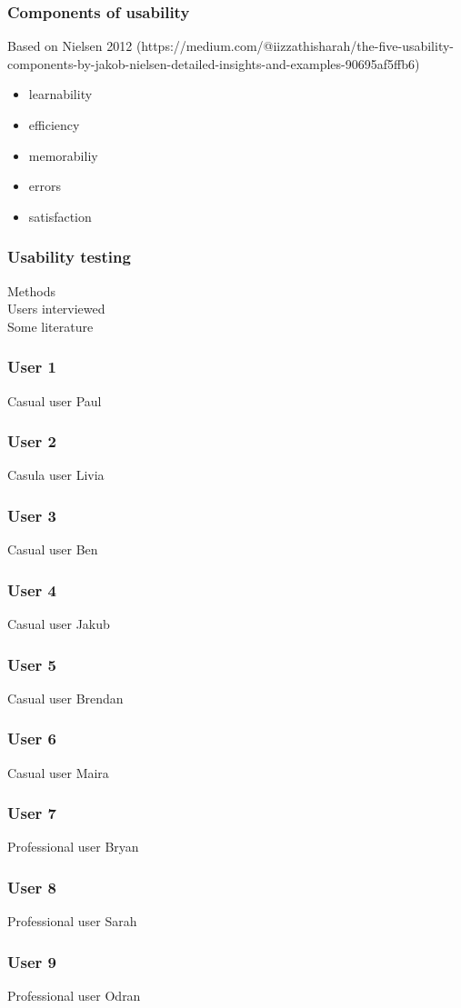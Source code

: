 \subsubsection{Components of usability}
Based on Nielsen 2012 (https://medium.com/@iizzathisharah/the-five-usability-components-by-jakob-nielsen-detailed-insights-and-examples-90695af5ffb6)

\begin{itemize}
    \item learnability
    \item efficiency
    \item memorabiliy
    \item errors
    \item satisfaction
\end{itemize}

\newpage
\subsubsection{Usability testing}
Methods\\
Users interviewed\\
Some literature\\

\newpage
\subsubsection{User 1}
Casual user Paul

\newpage
\subsubsection{User 2}
Casula user Livia

\newpage
\subsubsection{User 3}
Casual user Ben

\newpage
\subsubsection{User 4}
Casual user Jakub

\newpage
\subsubsection{User 5}
Casual user Brendan

\newpage
\subsubsection{User 6}
Casual user Maira

\newpage
\subsubsection{User 7}
Professional user Bryan

\newpage
\subsubsection{User 8}
Professional user Sarah

\newpage
\subsubsection{User 9}
Professional user Odran
